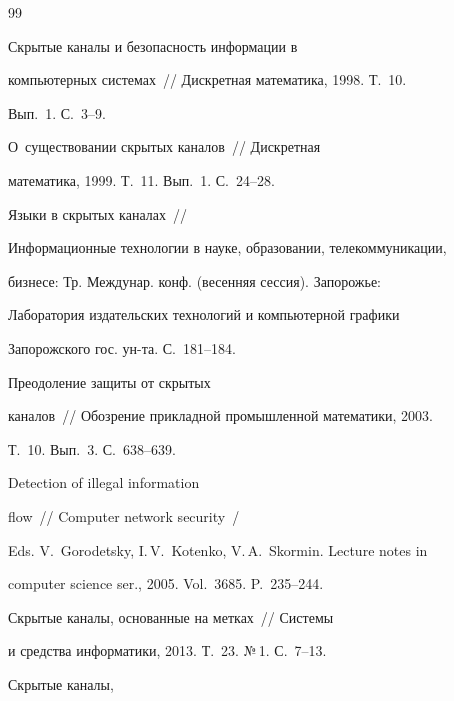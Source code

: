 {\small\frenchspacing


{%




\begin{thebibliography}{99}




 Скрытые каналы и безопасность информации в


компьютерных системах~/\!\!/ Дискретная математика, 1998. Т.~10.


Вып.~1. С.~3--9.




 О~существовании скрытых каналов~/\!\!/ Дискретная


математика, 1999. Т.~11. Вып.~1. С.~24--28.




 Языки в скрытых каналах~/\!\!/


Информационные технологии в науке, образовании, телекоммуникации,


бизнесе: Тр. Междунар. конф. (весенняя сессия). Запорожье:


Лаборатория издательских технологий и компьютерной графики


Запорожского гос. ун-та. С.~181--184.




 Преодоление защиты от скрытых


каналов~/\!\!/ Обозрение прикладной промышленной математики, 2003.


Т.~10. Вып.~3. С.~638--639.




 Detection of illegal information


flow~/\!\!/ Computer network security~/


Eds. V.~Gorodetsky, I.\,V.~Kotenko, V.\,A.~Skormin. Lecture notes in


computer science ser., 2005. Vol.~3685. P.~235--244.




 Скрытые каналы, основанные на метках~/\!\!/ Системы


и средства информатики, 2013. Т.~23. №\,1. С.~7--13.




 Скрытые каналы,



\end{thebibliography}}}
